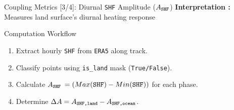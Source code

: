 \documentclass[8pt, aspectratio=169]{beamer}
\begin{document}
\begin{frame}[label=diurnal]{Coupling Metrics [3/4]: Diurnal \texttt{SHF} Amplitude ($A_{\text{\texttt{SHF}}}$)}
    \vspace{0.2cm}
    \textbf{Interpretation :} Measures land surface's diurnal heating response

    \begin{block}{Computation Workflow}
        \begin{enumerate}
            \item Extract hourly \texttt{SHF} from \texttt{ERA5} along track.
            \item Classify points using \texttt{is\_land} mask (\texttt{True/False}).
            \item Calculate $A_{\text{\texttt{SHF}}}$  $=(Max(\text{\texttt{SHF}}) - Min(\text{\texttt{SHF}}))$ for each phase.
            \item Determine $\Delta A = A_{\text{\texttt{SHF,land}}} - A_{\text{\texttt{SHF,ocean}}}$.
        \end{enumerate}
    \end{block}
\end{frame}
\end{document}
